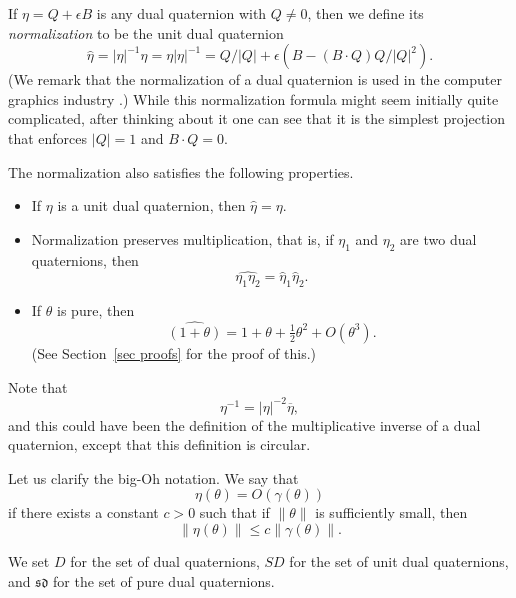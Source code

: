 \documentclass[reqno,12pt]{amsart}
\newcommand\setdualquat{D}
\newcommand\setunitdualquat{SD}
\newcommand\setpuredualquat{\mathfrak{sd}}
\begin{document}
If $\eta = Q + \epsilon B$ is any dual quaternion with $Q \ne 0$, then we define its \emph{normalization} to be the unit dual quaternion
\begin{equation}
\label{normalize}
\widehat \eta = |\eta|^{-1}\eta = \eta|\eta|^{-1}
= Q/|Q| + \epsilon (B - (B\cdot Q) Q/|Q|^2) .
\end{equation}
(We remark that the normalization of a dual quaternion is used in the computer graphics industry \cite{kavan-et-al, kavan-et-al-2}.)  While this normalization formula might seem initially quite complicated, after thinking about it one can see that it is the simplest projection that enforces $|Q| = 1$ and $B\cdot Q = 0$.

The normalization also satisfies the following properties.
\begin{itemize}
\item If $\eta$ is a unit dual quaternion, then $\widehat\eta = \eta$.
\item Normalization preserves multiplication, that is, if $\eta_1$ and $\eta_2$ are two dual quaternions, then
\begin{equation}
\widehat{\eta_1 \eta_2} = \widehat \eta_1 \widehat \eta_2 .
\end{equation}
\item If $\theta$ is pure, then
\begin{equation}
\label{approx normalize}
\widehat {(1+\theta)} = 1 + \theta + \tfrac12 \theta^2 + O(\theta^3).
\end{equation}
(See Section~\ref{sec proofs} for the proof of this.)
\end{itemize}
Note that
\begin{equation}
\eta^{-1} = |\eta|^{-2} \overline\eta,
\end{equation}
and this could have been the definition of the multiplicative inverse of a dual quaternion, except that this definition is circular.

Let us clarify the big-Oh notation.  We say that
\begin{equation}
\eta(\theta) = O(\gamma(\theta))
\end{equation}
if there exists a constant $c>0$ such that if $\|\theta\|$ is sufficiently small, then
\begin{equation}
\| \eta(\theta) \| \le c \| \gamma(\theta) \| .
\end{equation}

We set $\setdualquat$ for the set of dual quaternions, $\setunitdualquat$ for the set of unit dual quaternions, and $\setpuredualquat$ for the set of pure dual quaternions.
\end{document}
